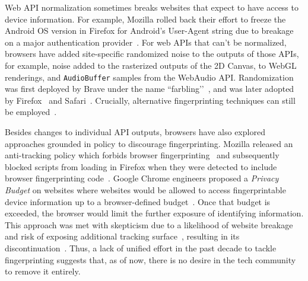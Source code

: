 %
Web API normalization sometimes breaks websites that expect to have access to device information. 
%
For example, Mozilla rolled back their effort to freeze the Android OS version in Firefox for Android’s User-Agent string due to breakage on a major authentication provider~\cite{peterson1865766FreezeAndroid2024}. 
%
For web APIs that can’t be normalized, browsers have added site-specific randomized noise to the outputs of those APIs, for example, noise added to the rasterized outputs of the 2D Canvas, to WebGL renderings, and \texttt{AudioBuffer} samples from the WebAudio API. 
%
Randomization was first deployed by Brave under the name ``farbling’’~\cite{braveprivacyteamFingerprintingDefenses202020}, and was later adopted by Firefox~\cite{huang1816056FprandomizationMeta2023} and Safari~\cite{wilanderPrivateBrowsing202024}. Crucially, alternative fingerprinting techniques can still be employed~\cite{linFashionFauxPas2023}.


Besides changes to individual API outputs, browsers have also explored approaches grounded in policy to discourage fingerprinting. 
%
Mozilla released an anti-tracking policy which forbids browser fingerprinting~\cite{mozillaSecurityTrackingPolicy2019} and subsequently blocked scripts from loading in Firefox when they were detected to include browser fingerprinting code~\cite{englehardtFirefox72Blocks2020}. 
%
Google Chrome engineers proposed a \textit{Privacy Budget} on websites where websites would be allowed to access fingerprintable device information up to a browser-defined budget~\cite{lasseyMikewestPrivacybudget2019}.
%
Once that budget is exceeded, the browser would limit the further exposure of identifying information. 
%
This approach was met with skepticism due to a likelihood of website breakage and risk of exposing additional tracking surface~\cite{snyderBraveFingerprintingPrivacy2019, rescorlaTechnicalCommentsPrivacy2021}, resulting in its discontinuation~\cite{leflerWhatHappenedPrivacy2024}. 
%
Thus, a lack of unified effort in the past decade to tackle fingerprinting suggests that, as of now, there is no desire in the tech community to remove it entirely. 
